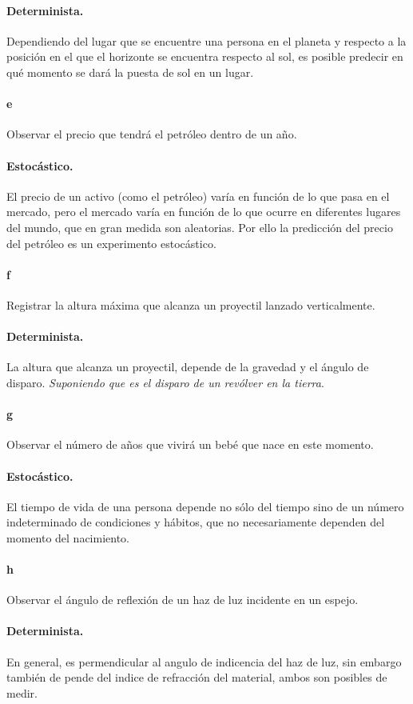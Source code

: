 \documentclass{article}
\begin{document}
\paragraph{Determinista.} Dependiendo del lugar que se encuentre una persona en el planeta y respecto a la posición en el que el horizonte se encuentra respecto al sol, es posible predecir en qué momento se dará la puesta de sol en un lugar.
\paragraph{e} Observar el precio que tendrá el petróleo dentro de un año.
\paragraph{Estocástico.} El precio de un activo (como el petróleo) varía en función de lo que pasa en el mercado, pero el mercado varía en función de lo que ocurre en diferentes lugares del mundo, que en gran medida son aleatorias. Por ello la predicción del precio del petróleo es un experimento estocástico.
\paragraph{f} Registrar la altura máxima que alcanza un proyectil lanzado verticalmente.
\paragraph{Determinista.} La altura que alcanza un proyectil, depende de la gravedad y el ángulo de disparo. \textit{Suponiendo que es el disparo de un revólver en la tierra}.
\paragraph{g} Observar el número de años que vivirá un bebé que nace en este momento.
\paragraph{Estocástico.} El tiempo de vida de una persona depende no sólo del tiempo sino de un número indeterminado de condiciones y hábitos, que no necesariamente dependen del momento del nacimiento.
\paragraph{h} Observar el ángulo de reflexión de un haz de luz incidente en un espejo.
\paragraph{Determinista.} En general, es permendicular al angulo de indicencia del haz de luz, sin embargo también de pende del indice de refracción del material, ambos son posibles de medir.
\end{document}
